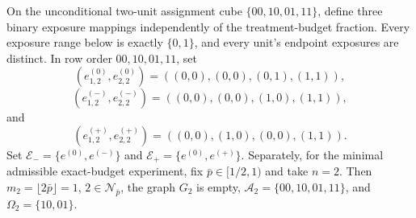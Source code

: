 On the unconditional two-unit assignment cube \(\{00,10,01,11\}\), define three binary exposure mappings independently of the treatment-budget fraction.  Every exposure range below is exactly \(\{0,1\}\), and every unit's endpoint exposures are distinct.  In row order \(00,10,01,11\), set
\[
 (e^{(0)}_{1,2},e^{(0)}_{2,2})=((0,0),(0,0),(0,1),(1,1)),
\]
\[
 (e^{(-)}_{1,2},e^{(-)}_{2,2})=((0,0),(0,0),(1,0),(1,1)),
\]
and
\[
 (e^{(+)}_{1,2},e^{(+)}_{2,2})=((0,0),(1,0),(0,0),(1,1)).
\]
Set \(\mathcal E_-=\{e^{(0)},e^{(-)}\}\) and \(\mathcal E_+=\{e^{(0)},e^{(+)}\}\).  Separately, for the minimal admissible exact-budget experiment, fix \(\bar p\in[1/2,1)\) and take \(n=2\).  Then \(m_2=\lfloor2\bar p\rfloor=1\), \(2\in\mathcal N_{\bar p}\), the graph \(G_2\) is empty, \(\mathcal A_2=\{00,10,01,11\}\), and \(\Omega_2=\{10,01\}\).